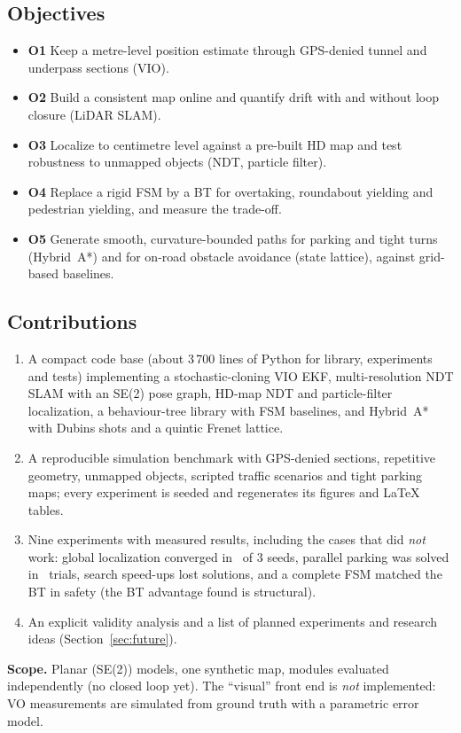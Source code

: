 \documentclass[11pt,a4paper]{article}
\begin{document}
\subsection{Objectives}
\begin{itemize}
\item \textbf{O1} Keep a metre-level position estimate through GPS-denied tunnel and underpass sections (VIO).
\item \textbf{O2} Build a consistent map online and quantify drift with and without loop closure (LiDAR SLAM).
\item \textbf{O3} Localize to centimetre level against a pre-built HD map and test robustness to unmapped objects (NDT, particle filter).
\item \textbf{O4} Replace a rigid FSM by a BT for overtaking, roundabout yielding and pedestrian yielding, and measure the trade-off.
\item \textbf{O5} Generate smooth, curvature-bounded paths for parking and tight turns (Hybrid~A*) and for on-road obstacle avoidance (state lattice), against grid-based baselines.
\end{itemize}

\subsection{Contributions}
\begin{enumerate}[label=\textbf{C\arabic*}]
\item A compact code base (about 3\,700 lines of Python for library, experiments and tests) implementing a stochastic-cloning VIO EKF, multi-resolution NDT SLAM with an SE(2) pose graph, HD-map NDT and particle-filter localization, a behaviour-tree library with FSM baselines, and Hybrid~A* with Dubins shots and a quintic Frenet lattice.
\item A reproducible simulation benchmark with GPS-denied sections, repetitive geometry, unmapped objects, scripted traffic scenarios and tight parking maps; every experiment is seeded and regenerates its figures and LaTeX tables.
\item Nine experiments with measured results, including the cases that did \emph{not} work: global localization converged in \hdGlobOk\ of 3 seeds, parallel parking was solved in \hyPar\ trials, search speed-ups lost solutions, and a complete FSM matched the BT in safety (the BT advantage found is structural).
\item An explicit validity analysis and a list of planned experiments and research ideas (Section~\ref{sec:future}).
\end{enumerate}
\textbf{Scope.} Planar (SE(2)) models, one synthetic map, modules evaluated independently (no closed loop yet). The ``visual'' front end is \emph{not} implemented: VO measurements are simulated from ground truth with a parametric error model.
\end{document}
